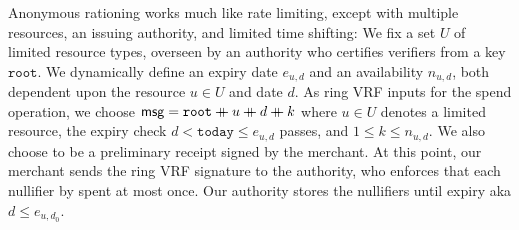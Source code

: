 Anonymous rationing works much like rate limiting, except with
 multiple resources, an issuing authority, and limited time shifting:
%
\def\expiry{e}
We fix a set $U$ of limited resource types, overseen by
an authority who certifies verifiers from a key $\mathtt{root}$.
We dynamically define an expiry date $\expiry_{u,d}$ and an availability $n_{u,d}$,
both dependent upon the resource $u \in U$ and date $d$.
As ring VRF inputs for the spend operation, we choose
$\mathsf{msg} = \mathtt{root} \mathbin{+\mkern-10mu+} u \mathbin{+\mkern-10mu+} d \mathbin{+\mkern-10mu+} k$
where $u \in U$ denotes a limited resource,
the expiry check $d < \mathtt{today} \le \expiry_{u,d}$ passes,
and $1 \le k \le n_{u,d}$.
We also choose \aux to be a preliminary receipt signed by the merchant.
%
At this point, our merchant sends the ring VRF signature to the authority,
who enforces that each nullifier by spent at most once.
Our authority stores the nullifiers until expiry aka $d \le \expiry_{u,d_0}$.



